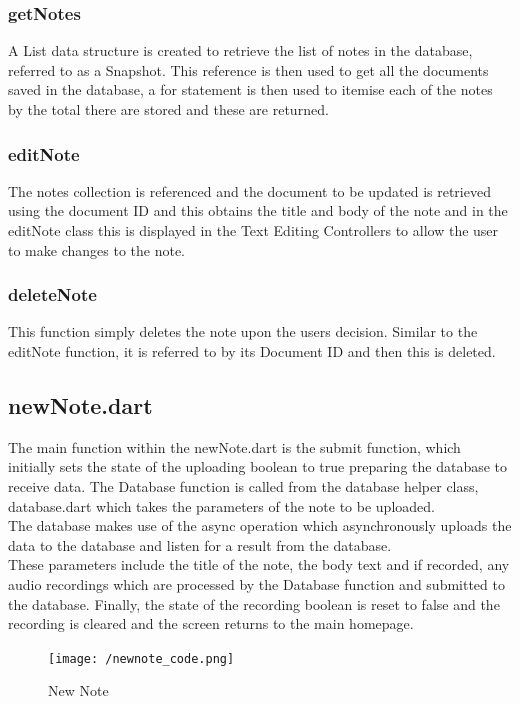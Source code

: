 \documentclass[oneside]{report}
\begin{document}
			\subsubsection{getNotes}
			A List data structure is created to retrieve the list of notes in the database, referred to as a Snapshot. This reference is then used to get all the documents saved in the database, a for statement is then used to itemise each of the notes by the total there are stored and these are returned.

			\subsubsection{editNote}
			The notes collection is referenced and the document to be updated is retrieved using the document ID and this obtains the title and body of the note and in the editNote class this is displayed in the Text Editing Controllers to allow the user to make changes to the note.

			\subsubsection{deleteNote}
			This function simply deletes the note upon the users decision. Similar to the editNote function, it is referred to by its Document ID and then this is deleted.

		\subsection{newNote.dart}
The main function within the newNote.dart is the submit function, which initially sets the state of the uploading boolean to true preparing the database to receive data. The Database function is called from the database helper class, database.dart which takes the parameters of the note to be uploaded.\\

The database makes use of the async operation which asynchronously uploads the data to the database and listen for a result from the database.\\

These parameters include the title of the note, the body text and if recorded, any audio recordings which are processed by the Database function and submitted to the database. Finally, the state of the recording boolean is reset to false and the recording is cleared and the screen returns to the main homepage.
		\begin{figure}[H]
			\begin{center}
	 		 	\texttt{[image: /newnote\_code.png]}
			\end{center}
			\caption[New Note]{New Note}
		\end{figure}
\end{document}

